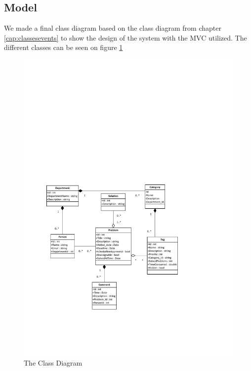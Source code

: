 \subsection{Model}
We made a final class diagram based on the class diagram from chapter \ref{cap:classesevents} to show the design of the system with the MVC utilized.
The different classes can be seen on figure \ref{fig:ClassDiagramV2}


\begin{figure}%
\includegraphics[width=\columnwidth]{input/component_design/ClassDiagramV2.pdf}%
\caption{The Class Diagram}%
\label{fig:ClassDiagramV2}%
\end{figure}


